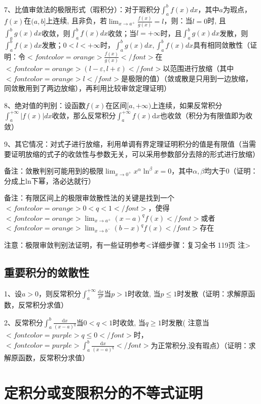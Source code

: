 7、比值审敛法的极限形式（瑕积分）：对于瑕积分$ \int_{a}^{b} f(x) d x $，其中$ a $为瑕点，$ f(x) $在$ ({a}, {b}] $上连续, 且非负，若$ \lim_{x \rightarrow a^{+}} \frac{f(x)}{g(x)}=l $，则：当$ l=0 $时, 且 $ \int_{a}^{b} g(x) d x $收敛，则$ \int_{a}^{b} f(x) d x $收敛；当$ l =+\infty $时，且$ \int_{a}^{b} g(x) d x $发散，则$ \int_{a}^{b} f(x) d x $发散；$ 0<l<+\infty $时，$ \int_{a}^{b} g(x) d x, \int_{a}^{b} f(x) d x $具有相同敛散性（证明：令$ <font color=orange>\frac{f(x)}{g(x)}</font> $在$ <font color=orange>(l-\varepsilon,l+\varepsilon)</font> $以范围进行放缩（其中$ <font color=orange>l</font> $是极限的值）（敛或散是只用到一边放缩，同敛散用到了两边放缩），再利用比较审敛定理证明）

8、绝对值的判别：设函数$ f(x) $在区间$ [a,+\infty) $上连续，如果反常积分$ \int_{a}^{+\infty}|f(x)| d x $收敛，那么反常积分$ \int_{a}^{+ \infty} f(x) \mathrm{d} x $也收敛（积分为有限值即为收敛）

9、其它情况：对式子进行放缩，利用单调有界定理证明积分的值是有限值（当需要证明放缩的式子的收敛性与参数无关，可以采用参数部分去除的形式进行放缩）

备注：敛散判别可能用到的极限$ \lim _{x \rightarrow 0^{+}} x^{\alpha} \ln ^{\beta} x=0 $，其中$ {\alpha},{\beta} $均大于0（证明：分成上ln下幂，洛必达就行）

备注：有限区间上的极限审敛散性法的关键是找到一个$ <font color=orange>0<q<1</font> $，使得$ <font color=orange>\lim_{x \rightarrow a^{+}}(x-a)^{q} f(x)</font> $或者$ <font color=orange>\lim_{x \rightarrow b^{-}}(b-x)^{q} f(x)</font> $存在

注意：极限审敛判别法证明，有一些证明参考<详细步骤：复习全书 119页 注>



\subsection{重要积分的敛散性}

1、设$ a>0 $，则反常积分$ \int_{a}^{+\infty} \frac{\mathrm{d} x}{x^{p}} $当$ p>1 $时收敛, 当$ p \leqslant 1 $时发散（证明：求解原函数，反常积分求值）

2、反常积分$ \int_{a}^{b} \frac{\mathrm{d} x}{(x-a)^{q}} $当$ 0<q<1 $时收敛, 当$ q \geqslant 1 $时发散( 注意当$ <font color=purple>q \leqslant 0</font> $时，$ <font color=purple>\int_{a}^{b} \frac{\mathrm{d} x}{(x-a)^{q}}</font> $为正常积分,没有瑕点）（证明：求解原函数，反常积分求值）

\section{定积分或变限积分的不等式证明}

